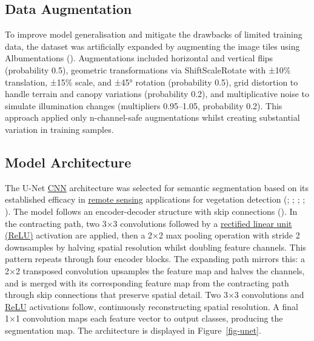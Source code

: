 \documentclass[
]{scrreprt}
\begin{document}
\subsection{Data Augmentation}\label{data-augmentation}

To improve model generalisation and mitigate the drawbacks of limited
training data, the dataset was artificially expanded by augmenting the
image tiles using Albumentations
().
Augmentations included horizontal and vertical flips (probability 0.5),
geometric transformations via ShiftScaleRotate with ±10\% translation,
±15\% scale, and ±45° rotation (probability 0.5), grid distortion to
handle terrain and canopy variations (probability 0.2), and
multiplicative noise to simulate illumination changes (multipliers
0.95--1.05, probability 0.2). This approach applied only n-channel-safe
augmentations whilst creating substantial variation in training samples.

\subsection{Model Architecture}\label{model-architecture}

The U-Net \hyperref[acronyms_CNN]{CNN} architecture was selected for
semantic segmentation based on its established efficacy in
\hyperref[acronyms_RS]{remote sensing} applications for vegetation
detection (; ; ; ; ). The model follows an encoder-decoder structure with skip
connections (). In the contracting path, two 3×3 convolutions followed
by a \hyperref[acronyms_ReLU]{rectified linear unit (ReLU)} activation
are applied, then a 2×2 max pooling operation with stride 2 downsamples
by halving spatial resolution whilst doubling feature channels. This
pattern repeats through four encoder blocks. The expanding path mirrors
this: a 2×2 transposed convolution upsamples the feature map and halves
the channels, and is merged with its corresponding feature map from the
contracting path through skip connections that preserve spatial detail.
Two 3×3 convolutions and \hyperref[acronyms_ReLU]{ReLU} activations
follow, continuously reconstructing spatial resolution. A final 1×1
convolution maps each feature vector to output classes, producing the
segmentation map. The architecture is displayed in
Figure~\ref{fig-unet}.
\end{document}

